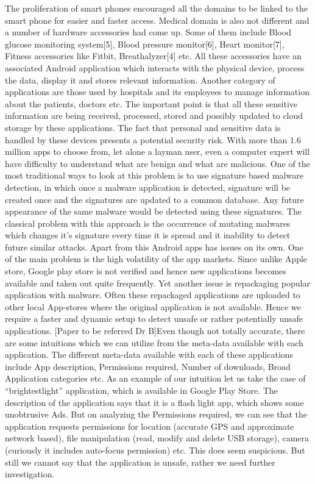The proliferation of smart phones encouraged all the domains to be linked to the smart phone for easier and faster access. Medical domain is also not different and a number of hardware accessories had come up. Some of them include Blood glucose monitoring system[5], Blood pressure monitor[6], Heart monitor[7], Fitness accessories like Fitbit, Breathalyzer[4] etc. All these accessories have an associated Android application which interacts with the physical device, process the data, display it and stores relevant information. Another category of applications are those used by hospitals and its employees to manage information about the patients, doctors etc. The important point is that all these sensitive information are being received, processed, stored and possibly updated to cloud storage by these applications. 
The fact that personal and sensitive data is handled by these devices presents a potential security risk. With more than 1.6 million apps to choose from, let alone a layman user, even a computer expert will have difficulty to understand what are benign and what are malicious. One of the most traditional ways to look at this problem is to use signature based malware detection, in which once a malware application is detected, signature will be created once and the signatures are updated to a common database. Any future appearance of the same malware would be detected using these signatures. The classical problem with this approach is the occurrence of mutating malwares which changes it’s signature every time it is spread and it inability to detect future similar attacks. Apart from this Android apps has issues on its own. One of the main problem is the high volatility of the app markets. Since unlike Apple store, Google play store is not verified and hence new applications becomes available and taken out quite frequently. Yet another issue is repackaging popular application with malware. Often these repackaged applications are uploaded to other local App-stores where the original application is not available. 
Hence we require a faster and dynamic setup to detect unsafe or rather potentially unsafe applications. [Paper to be referred Dr B]Even though not totally accurate, there are some intuitions which we can utilize from the meta-data available with each application. The different meta-data available with each of these applications include App description, Permissions required, Number of downloads, Broad Application categories etc. As an example of our intuition let us take the case of “brightestlight” application, which is available in Google Play Store. The description of the application says that it is a flash light app, which shows some unobtrusive Ads. But on analyzing the Permissions required, we can see that the application requests permissions for location (accurate GPS and approximate network based), file manipulation (read, modify and delete USB storage), camera (curiously it includes auto-focus permission) etc. This does seem suspicious. But still we cannot say that the application is unsafe, rather we need further investigation. 

